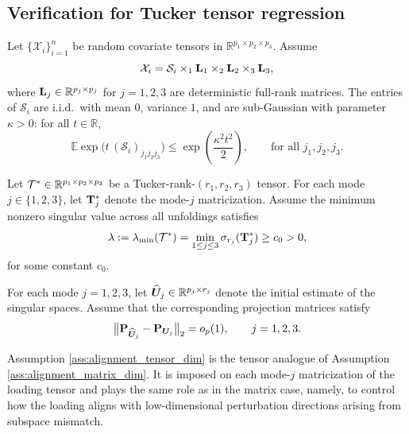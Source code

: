 \documentclass[authoryear,preprint,review,12pt]{elsarticle}
\begin{document}
	
	
	
	
	
	\subsection{Verification for Tucker tensor regression}
	\label{subsec:theory-tensor}
	
	\begin{assumption}
		\label{assum:xsubgtsr}
		Let $\{\mathcal{X}_i\}_{i=1}^n$ be random covariate tensors in
		$\mathbb{R}^{p_1\times p_2\times p_3}$. Assume
		\[
		\mathcal{X}_i = \mathcal{S}_i \times_1 \mathbf{L}_1 \times_2 \mathbf{L}_2 \times_3 \mathbf{L}_3,
		\]
		where $\mathbf{L}_j\in\mathbb{R}^{p_j\times p_j}$ for $j=1,2,3$ are deterministic full-rank matrices.
		The entries of $\mathcal{S}_i$ are i.i.d.\ with mean $0$, variance $1$, and are sub-Gaussian
		with parameter $\kappa>0$: for all $t\in\mathbb{R}$,
		\[
		\mathbb{E}\exp\!\big(t\,(\mathcal{S}_i)_{j_1j_2j_3}\big)
		\le \exp\!\left(\frac{\kappa^2 t^2}{2}\right),
		\qquad \text{for all } j_1,j_2,j_3.
		\]
	\end{assumption}
	
	\begin{assumption}\label{ass:tensor_signal}
		Let $\mathcal{T}^\ast\in\mathbb{R}^{p_1\times p_2\times p_3}$ be a Tucker-rank-$(r_1,r_2,r_3)$ tensor.
		For each mode $j\in\{1,2,3\}$, let $\mathbf{T}_j^\ast$ denote the mode-$j$ matricization.
		Assume the minimum nonzero singular value across all unfoldings satisfies
		\[
		\lambda:=\lambda_{\min}(\mathcal{T}^\ast)
		=\min_{1\le j\le 3}\sigma_{r_j}(\mathbf{T}_j^\ast)\ge c_0>0,
		\]
		for some constant $c_0$.
	\end{assumption}
	
	\begin{assumption}
		\label{assum:tsrinit} 
		For each mode $j=1,2,3$, let $\widehat {\boldsymbol U}_j\in\mathbb R^{p_j\times r_j}$ denote the initial estimate of the singular spaces.  
		Assume that the corresponding projection matrices satisfy
		\[
		\bigl\|\mathbf{P}_{\widehat {\boldsymbol U}_j}-\mathbf{P}_{\boldsymbol U_j}\bigr\|_2
		= o_p(1),
		\qquad j=1,2,3.
		\]
	\end{assumption}
	
	Assumption \ref{ass:alignment_tensor_dim} is the tensor analogue of Assumption \ref{ass:alignment_matrix_dim}. It is imposed on each mode-$j$
	matricization of the loading tensor and plays the same role as in the matrix case, namely,
	to control how the loading aligns with low-dimensional perturbation directions arising from
	subspace mismatch.
	
\end{document}

